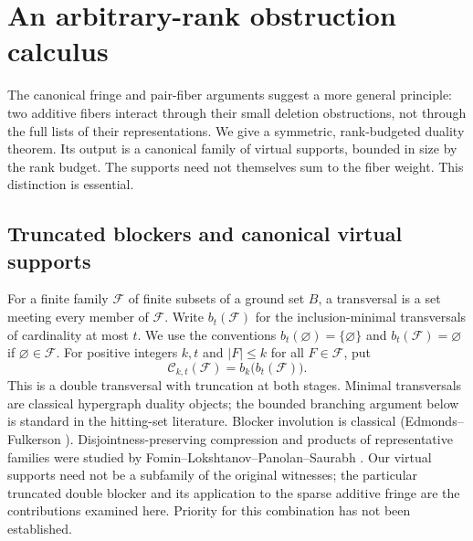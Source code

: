 \documentclass[11pt]{article}
\theoremstyle{remark}\newtheorem{remark}[theorem]{Remark}
\begin{document}
\section{An arbitrary-rank obstruction calculus}\label{sec:cores}
The canonical fringe and pair-fiber arguments suggest a more general principle: two additive fibers interact through their small deletion obstructions, not through the full lists of their representations. We give a symmetric, rank-budgeted duality theorem. Its output is a canonical family of virtual supports, bounded in size by the rank budget. The supports need not themselves sum to the fiber weight. This distinction is essential.

\subsection{Truncated blockers and canonical virtual supports}
For a finite family $\mathcal F$ of finite subsets of a ground set $B$, a transversal is a set meeting every member of $\mathcal F$. Write $b_t(\mathcal F)$ for the inclusion-minimal transversals of cardinality at most $t$. We use the conventions $b_t(\varnothing)=\{\varnothing\}$ and $b_t(\mathcal F)=\varnothing$ if $\varnothing\in\mathcal F$. For positive integers $k,t$ and $|F|\le k$ for all $F\in\mathcal F$, put
\[
\mathcal C_{k,t}(\mathcal F)=b_k\bigl(b_t(\mathcal F)\bigr).
\]
This is a double transversal with truncation at both stages. Minimal transversals are classical hypergraph duality objects; the bounded branching argument below is standard in the hitting-set literature. Blocker involution is classical (Edmonds--Fulkerson \cite{EF}). Disjointness-preserving compression and products of representative families were studied by Fomin--Lokshtanov--Panolan--Saurabh \cite{FLPS,FLPSprod}. Our virtual supports need not be a subfamily of the original witnesses; the particular truncated double blocker and its application to the sparse additive fringe are the contributions examined here. Priority for this combination has not been established.
\end{document}
